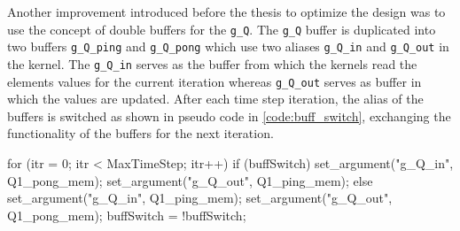 Another improvement introduced before the thesis
to optimize the design was to use the concept of double buffers for the \texttt{g\_Q}.
The \texttt{g\_Q} buffer is duplicated into two buffers \texttt{g\_Q\_ping} and \texttt{g\_Q\_pong}
which use two aliases \texttt{g\_Q\_in} and \texttt{g\_Q\_out} in the kernel. The \texttt{g\_Q\_in}
serves as the buffer from which the kernels read the elements values for the current iteration whereas
\texttt{g\_Q\_out} serves as buffer in which the values
are updated. After each time step iteration, the alias of the buffers is switched as shown
in pseudo code in \ref{code:buff_switch}, exchanging the functionality of the buffers for the next iteration.
\begin{CppCode}[caption=Buffer switching for double buffers in each iteration, frame=tlrb, label=code:buff_switch, float]
for (itr = 0; itr < MaxTimeStep; itr++)
{
    if (buffSwitch)
    {
        set_argument("g_Q_in", Q1_pong_mem);
        set_argument("g_Q_out", Q1_ping_mem);
    }
    else
    {
        set_argument("g_Q_in", Q1_ping_mem);
        set_argument("g_Q_out", Q1_pong_mem);
    }
    buffSwitch = !buffSwitch;
}
\end{CppCode}

